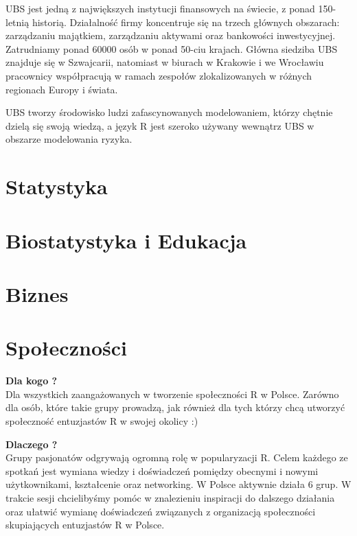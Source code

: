 \documentclass[11pt,twoside,b5paper]{book}
\begin{document}
UBS jest jedną z największych instytucji finansowych na świecie, z ponad 150-letnią historią. Działalność firmy koncentruje się na trzech głównych obszarach: zarządzaniu majątkiem, zarządzaniu aktywami oraz bankowości inwestycyjnej. Zatrudniamy ponad 60000 osób w ponad 50-ciu krajach. Główna siedziba UBS znajduje się w Szwajcarii, natomiast w biurach w Krakowie i we Wrocławiu pracownicy współpracują w ramach zespołów zlokalizowanych w różnych regionach Europy i świata.

UBS tworzy środowisko ludzi zafascynowanych modelowaniem, którzy chętnie dzielą się swoją wiedzą, a język R jest szeroko używany wewnątrz UBS w obszarze modelowania ryzyka.



\newpage
\section{Statystyka}





\newpage
\section{Biostatystyka i Edukacja}





\newpage
\section{Biznes}

\newpage



\newpage
\section{Społeczności}
\textbf{Dla kogo ?} \\
Dla wszystkich zaangażowanych w tworzenie społeczności R w Polsce. Zarówno dla osób, które takie grupy prowadzą, jak również dla tych którzy chcą utworzyć społeczność entuzjastów R w swojej okolicy :)

\textbf{Dlaczego ?}\\
Grupy pasjonatów odgrywają ogromną rolę w popularyzacji R. Celem każdego ze spotkań jest wymiana wiedzy i doświadczeń pomiędzy obecnymi i nowymi użytkownikami, kształcenie oraz networking. W Polsce aktywnie działa 6 grup. W trakcie sesji chcielibyśmy pomóc w znalezieniu inspiracji do dalszego działania oraz ułatwić wymianę doświadczeń związanych z organizacją społeczności skupiających entuzjastów R w Polsce.
\end{document}
